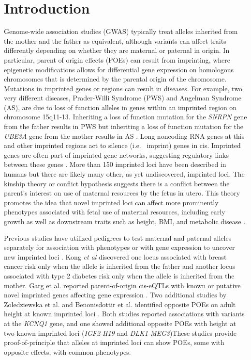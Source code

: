 \section{Introduction}\label{ch02-introduction}
Genome-wide association studies (GWAS) typically treat alleles inherited from the mother and the father as equivalent, although variants can affect traits differently depending on whether they are maternal or paternal in origin. In particular, parent of origin effects (POEs) can result from imprinting, where epigenetic modifications allows for differential gene expression on homologous chromosomes that is determined by the parental origin of the chromosome. Mutations in imprinted genes or regions can result in diseases. For example, two very different diseases, Prader-Willi Syndrome (PWS) and Angelman Syndrome (AS), are due to loss of function alleles in genes within an imprinted region on chromosome 15q11-13. Inheriting a loss of function mutation for the \emph{SNRPN} gene from the father results in PWS but inheriting a loss of function mutation for the \emph{UBE3A} gene from the mother results in AS \citep{Peters2014,Falls1999}.  Long noncoding RNA genes at this and other imprinted regions act to silence (i.e.~ imprint) genes in cis. Imprinted genes are often part of imprinted gene networks, suggesting regulatory links between these genes \cite{Patten:2016cb,Gabory:2009be,Varrault:2006kn}. More than 150 imprinted loci have been described in humans \cite{Benonisdottir:2016dz} but there are likely many other, as yet undiscovered, imprinted loci. The kinship theory or conflict hypothesis suggests there is a conflict between the parent's interest on use of maternal resources by the fetus in utero. This theory promotes the idea that novel imprinted loci can affect more prominently phenotypes associated with fetal use of maternal resources, including early growth as well as downstream traits such as height, BMI, and metabolic disease \citep{Peters2014}.

Previous studies have utilized pedigrees to test maternal and paternal alleles separately for association with phenotypes or with gene expression to uncover new imprinted loci \citep{Kong:2009kk,Baran:2015cx,Garg2012a,Paper2014b,Benonisdottir:2016dz}. Kong \emph{et al} \citep{Kong:2009kk} discovered one locus associated with breast cancer risk only when the allele is inherited from the father and another locus associated with type 2 diabetes risk only when the allele is inherited from the mother. Garg et al. reported parent-of-origin cis-eQTLs with known or putative novel imprinted genes affecting gene expression \citep{Garg2012a}. Two additional studies by Zoledziewska et al. and Benonisdottir et al. identified opposite POEs on adult height at known imprinted loci \citep{Zoledziewska:2015do,Benonisdottir:2016dz}. Both studies reported associations with variants at the \emph{KCNQ1} gene, and one showed additional opposite POEs with height at two known imprinted loci (\emph{IGF2-H19} and \emph{DLK1-MEG3})\citep{Benonisdottir:2016dz}These studies provide proof-of-principle that alleles at imprinted loci can show POEs, some with opposite effects, with common phenotypes. 


